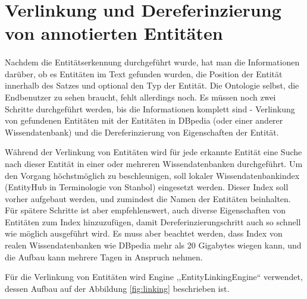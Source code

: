 \section{Verlinkung und Dereferinzierung von annotierten Entitäten}
\paragraph{}
Nachdem die Entitätserkennung durchgeführt wurde, hat man die Informationen darüber, ob es Entitäten im Text gefunden wurden, die Position der Entität innerhalb des Satzes und optional den Typ der Entität. Die Ontologie selbst, die Endbenutzer zu sehen braucht, fehlt allerdings noch. Es müssen noch zwei Schritte durchgeführt werden, bis die Informationen komplett sind - Verlinkung von gefundenen Entitäten mit der Entitäten in DBpedia (oder einer anderer Wissendatenbank) und die Dereferinzierung von Eigenschaften der Entität.

Während der Verlinkung von Entitäten wird für jede erkannte Entität eine Suche nach dieser Entität in einer oder mehreren Wissendatenbanken durchgeführt. Um den Vorgang höchstmöglich zu beschleunigen, soll lokaler Wissendatenbankindex (EntityHub in Terminologie von Stanbol) eingesetzt werden. Dieser Index soll vorher aufgebaut werden, und zumindest die Namen der Entitäten beinhalten. Für spätere Schritte ist aber empfehlenswert, auch diverse Eigenschaften von Entitäten zum Index hinzuzufügen, damit Dereferinzierungschritt auch so schnell wie möglich ausgeführt wird. Es muss aber beachtet werden, dass Index von realen Wissendatenbanken wie DBpedia mehr als 20 Gigabytes wiegen kann, und die Aufbau kann mehrere Tagen in Anspruch nehmen.

Für die Verlinkung von Entitäten wird Engine ,,EntityLinkingEngine`` verwendet, dessen Aufbau auf der Abbildung \ref{fig:linking} beschrieben ist.

